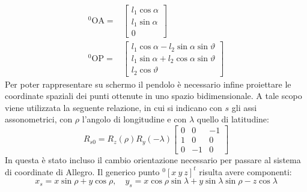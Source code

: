 \begin{equation}
	\begin{aligned}
	^0\!\mathrm{OA} = &\left[ \begin{array}{c} l_1 \cos\alpha \\ l_1 \sin \alpha \\ 0 \end{array}\right] \\
	^0\!\mathrm{OP} = &\left[ \begin{array}{c} l_1 \cos \alpha - l_2 \sin \alpha \sin \vartheta\\ l_1 \sin \alpha + l_2 \cos \alpha \sin \vartheta\\ l_2 \cos \vartheta \end{array}\right]
	\end{aligned}
\end{equation}
Per poter rappresentare su schermo il pendolo \`e necessario infine proiettare le coordinate spaziali dei punti ottenute in uno spazio bidimensionale. A tale scopo viene utilizzata la seguente relazione, in cui si indicano con $s$ gli assi assonometrici, con $\rho$ l'angolo di longitudine e con $\lambda$ quello di latitudine:
\begin{equation}
	R_{s0} = R_z (\rho)  R_y (-\lambda)  \begin{bmatrix}
	0 & 0 & -1\\
	1 & 0 & 0\\
	0 & -1 & 0
	\end{bmatrix}
\label{eq:proiezione}
\end{equation}
In questa \`e stato incluso il cambio orientazione necessario per passare al sistema di coordinate di Allegro.
Il generico punto $^0\!\left[ x \ y \ z \right]^t $ risulta avere componenti:
\begin{equation}
	x_{s} = x\sin\rho + y\cos\rho, \quad y_{s} = x \cos \rho \sin \lambda + y \sin \lambda \sin \rho - z \cos \lambda
\end{equation}